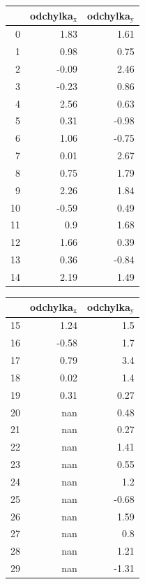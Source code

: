 \documentclass[11pt,titlepage]{article}
\begin{document}
\begin{figure}[htbp]\centering\begin{subfigure}[t]{0.5\textwidth}
\begin{center}
\begin{tabular}{rrr}
 & odchylka\(_{\text{x}}\) & odchylka\(_{\text{y}}\)\\
\hline
0 & 1.83 & 1.61\\
1 & 0.98 & 0.75\\
2 & -0.09 & 2.46\\
3 & -0.23 & 0.86\\
4 & 2.56 & 0.63\\
5 & 0.31 & -0.98\\
6 & 1.06 & -0.75\\
7 & 0.01 & 2.67\\
8 & 0.75 & 1.79\\
9 & 2.26 & 1.84\\
10 & -0.59 & 0.49\\
11 & 0.9 & 1.68\\
12 & 1.66 & 0.39\\
13 & 0.36 & -0.84\\
14 & 2.19 & 1.49\\
\end{tabular}
\end{center}
\end{subfigure}\hfill\begin{subfigure}[t]{0.5\textwidth}
\begin{center}
\begin{tabular}{rrr}
 & odchylka\(_{\text{x}}\) & odchylka\(_{\text{y}}\)\\
\hline
15 & 1.24 & 1.5\\
16 & -0.58 & 1.7\\
17 & 0.79 & 3.4\\
18 & 0.02 & 1.4\\
19 & 0.31 & 0.27\\
20 & nan & 0.48\\
21 & nan & 0.27\\
22 & nan & 1.41\\
23 & nan & 0.55\\
24 & nan & 1.2\\
25 & nan & -0.68\\
26 & nan & 1.59\\
27 & nan & 0.8\\
28 & nan & 1.21\\
29 & nan & -1.31\\
\end{tabular}
\end{center}
\end{subfigure}\end{figure}
\end{document}
